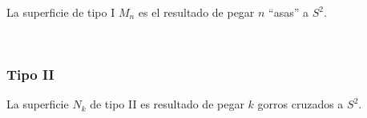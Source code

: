 \documentclass[GTSResumen.tex]{subfiles}
\begin{document}
\begin{teorema} La superficie de tipo I $M_n$ es el resultado de pegar $n$ ``asas'' a $S^2$.
\end{teorema}\
\subsubsection{Tipo II}
\begin{comment}
\begin{flushleft}
Consideremos $\Pro_2\R$
\begin{figure}[h!]
	\texttt{[image: gorroink]}
\end{figure}
\end{flushleft}\
\end{comment}
\begin{teorema} La superficie $N_k$ de tipo II es resultado de pegar $k$ gorros cruzados a $S^2$.
\end{teorema}
\begin{comment}
\begin{observacion}
Un gorro cruzado no es más que la banda de Möbius $\Pro_2\R\setminus B$ con la circunferencia del borde colocada en un plano. Así pues, la intersección aparente del gorro cruzado desaparece si retorcemos el borde del disco $B$, pero entonces no podemos pegar $B$ a ese borde retorcido y, a la vez,  quedarnos en el espacio tridimensional $\R^3$ sin introducir una intersección aparente. 

Debido a la imposibilidad de sumergir $\Pro_2\R$ en $\R^3$, cualquier representación tridimensional de $\Pro_2\R$ debe contener puntos dobles. Lo mismo ocurre para el resto de superficies de tipo II.


\end{observacion}
\end{comment}
\end{document}
